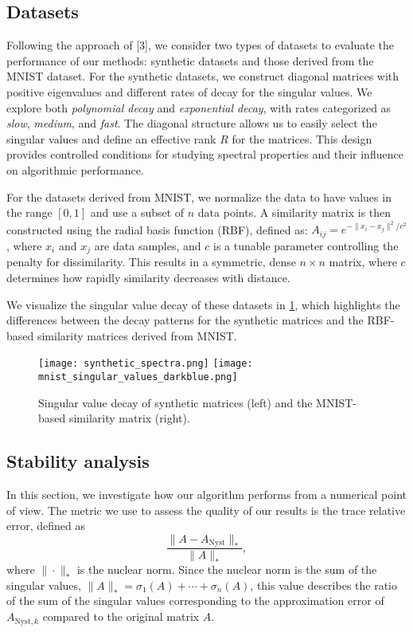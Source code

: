 \documentclass[a4paper, 12pt,oneside]{article}
\begin{document}
		\subsection{Datasets}
		Following the approach of [3], we consider two types of datasets to evaluate the performance of our methods: synthetic datasets and those derived from the MNIST dataset. For the synthetic datasets, we construct diagonal matrices with positive eigenvalues and different rates of decay for the singular values. We explore both \textit{polynomial decay} and \textit{exponential decay}, with rates categorized as \textit{slow}, \textit{medium}, and \textit{fast}. The diagonal structure allows us to easily select the singular values and define an effective rank \( R \) for the matrices. This design provides controlled conditions for studying spectral properties and their influence on algorithmic performance.

	For the datasets derived from MNIST, we normalize the data to have values in the range \([0, 1]\) and use a subset of \( n \) data points. A similarity matrix is then constructed using the radial basis function (RBF), defined as:
	$A_{ij} = e^{-\|x_i - x_j\|^2 / c^2}$, where \( x_i \) and \( x_j \) are data samples, and \( c \) is a tunable parameter controlling the penalty for dissimilarity. This results in a symmetric, dense \( n \times n \) matrix, where \( c \) determines how rapidly similarity decreases with distance. 

	We visualize the singular value decay of these datasets in \cref{fig:singular_value_comparison}, which highlights the differences between the decay patterns for the synthetic matrices and the RBF-based similarity matrices derived from MNIST.
	\begin{figure}[H]
		\centering
		\texttt{[image: synthetic\_spectra.png]}
		\hspace{0.02\textwidth} %
		\texttt{[image: mnist\_singular\_values\_darkblue.png]}
		\caption{Singular value decay of synthetic matrices (left) and the MNIST-based similarity matrix (right).}
		\label{fig:singular_value_comparison}
	\end{figure}
		\subsection{Stability analysis}
		
		In this section, we investigate how our algorithm performs from a numerical point of view. The metric we use to assess the quality of our results is the trace relative error, defined as
	\[
	\frac{\|A - A_{\text{Nyst}}\|_*}{\|A\|_*},
	\]
	where \(\|\cdot\|_*\) is the nuclear norm. Since the nuclear norm is the sum of the singular values, \(\|A\|_* = \sigma_1(A) + \cdots + \sigma_n(A)\), this value describes the ratio of the sum of the singular values corresponding to the approximation error of \(A_{\text{Nyst}, k}\) compared to the original matrix \(A\).
\end{document}
